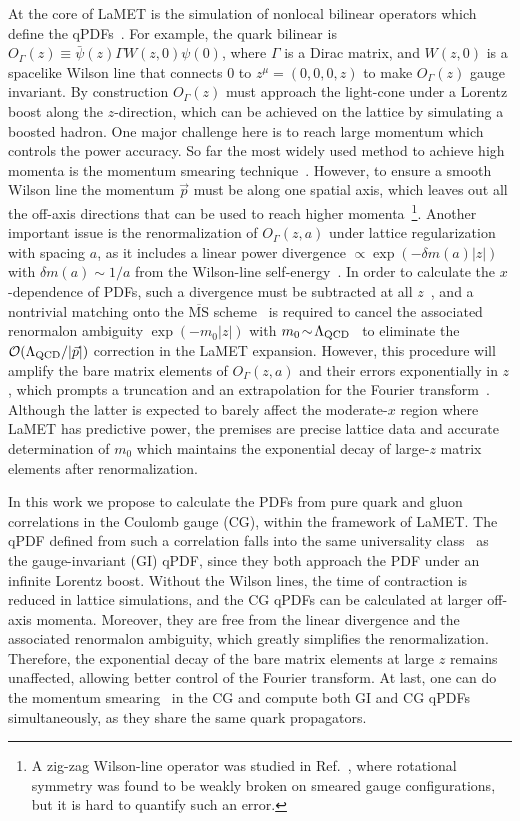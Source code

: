 \documentclass[prd,twocolumn,preprintnumbers,showpacs,nofootinbib,superscriptaddress,notitlepage,floatfix]{revtex4-1}
\newcommand{\MS}{{\overline{\mathrm{MS}}}}
\begin{document}
At the core of LaMET is the simulation of nonlocal bilinear operators which define the qPDFs~\cite{Ji:2013dva}. For example, the quark bilinear is $O_\Gamma(z)\equiv \bar{\psi}(z)\Gamma W(z,0) \psi(0)$, where $\Gamma$ is a Dirac matrix, and $W(z,0)$ is a spacelike Wilson line that connects $0$ to $z^\mu=(0,0,0,z)$ to make $O_\Gamma(z)$ gauge invariant. 
By construction $O_\Gamma(z)$ must approach the light-cone under a Lorentz boost along the $z$-direction, which can be achieved on the lattice by simulating a boosted hadron. One major challenge here is to reach large momentum which controls the power accuracy. 
So far the most widely used method to achieve high momenta is the momentum smearing technique~\cite{Bali:2016lva}.
However, to ensure a smooth Wilson line the momentum $\vec{p}$ must be along one spatial axis, which leaves out all the off-axis directions that can be used to reach higher momenta~\footnote{A zig-zag Wilson-line operator was studied in Ref.~\cite{Musch:2010ka}, where rotational symmetry was found to be weakly broken on smeared gauge configurations, but it is hard to quantify such an error.}.
Another important issue is the renormalization of $O_\Gamma(z,a)$ under lattice regularization with spacing $a$, as it includes a linear power divergence $\propto \exp(-\delta m(a)|z|)$ with $\delta m(a) \!\sim \!1/a$ from the Wilson-line self-energy~\cite{Dorn:1986dt,Maiani:1991az}. In order to calculate the $x$-dependence of PDFs, such a divergence must be subtracted at all $z$~\cite{Ji:2020brr}, and a nontrivial matching onto the $\MS$ scheme~\cite{Holligan:2023rex,Zhang:2023bxs} is required to cancel the associated renormalon ambiguity $\exp(-m_0|z|)$ with $m_0\!\sim\! \Lambda_{\rm QCD}$~\cite{Bali:2013pla} to eliminate the ${\cal O}(\Lambda_{\rm QCD}/|\vec{p}|)$ correction in the LaMET expansion. However, this procedure will amplify the bare matrix elements of $O_\Gamma(z,a)$ and their errors exponentially in $z$, which prompts a truncation and an extrapolation for the Fourier transform~\cite{Ji:2020brr}. Although the latter is expected to barely affect the moderate-$x$ region where LaMET has predictive power, the premises are precise lattice data and accurate determination of $m_0$ which maintains the exponential decay of large-$z$ matrix elements after renormalization.

In this work we propose to calculate the PDFs from pure quark and gluon correlations in the Coulomb gauge (CG), within the framework of LaMET. The qPDF defined from such a correlation falls into the same universality class~\cite{Hatta:2013gta,Ji:2020ect} as the gauge-invariant (GI) qPDF, since they both approach the PDF under an infinite Lorentz boost. 
Without the Wilson lines, the time of contraction is reduced in lattice simulations, and the CG qPDFs can be calculated at larger off-axis momenta. Moreover, they are free from the linear divergence and the associated renormalon ambiguity, which greatly simplifies the renormalization. Therefore, the exponential decay of the bare matrix elements at large $z$ remains unaffected, allowing better control of the Fourier transform. At last, one can do the momentum smearing~\cite{Izubuchi:2019lyk,Gao:2020ito} in the CG and compute both GI and CG qPDFs simultaneously, as they share the same quark propagators.
\end{document}
